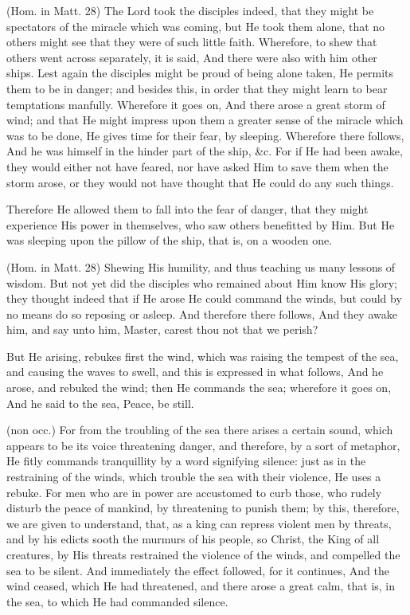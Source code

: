 (Hom. in Matt. 28) The Lord took the disciples indeed, that they might be spectators of the miracle which was coming, but He took them alone, that no others might see that they were of such little faith. Wherefore, to shew that others went across separately, it is said, And there were also with him other ships. Lest again the disciples might be proud of being alone taken, He permits them to be in danger; and besides this, in order that they might learn to bear temptations manfully. Wherefore it goes on, And there arose a great storm of wind; and that He might impress upon them a greater sense of the miracle which was to be done, He gives time for their fear, by sleeping. Wherefore there follows, And he was himself in the hinder part of the ship, \&c. For if He had been awake, they would either not have feared, nor have asked Him to save them when the storm arose, or they would not have thought that He could do any such things.

 Therefore He allowed them to fall into the fear of danger, that they might experience His power in themselves, who saw others benefitted by Him. But He was sleeping upon the pillow of the ship, that is, on a wooden one.

 (Hom. in Matt. 28) Shewing His humility, and thus teaching us many lessons of wisdom. But not yet did the disciples who remained about Him know His glory; they thought indeed that if He arose He could command the winds, but could by no means do so reposing or asleep. And therefore there follows, And they awake him, and say unto him, Master, carest thou not that we perish?

 But He arising, rebukes first the wind, which was raising the tempest of the sea, and causing the waves to swell, and this is expressed in what follows, And he arose, and rebuked the wind; then He commands the sea; wherefore it goes on, And he said to the sea, Peace, be still.

 (non occ.) For from the troubling of the sea there arises a certain sound, which appears to be its voice threatening danger, and therefore, by a sort of metaphor, He fitly commands tranquillity by a word signifying silence: just as in the restraining of the winds, which trouble the sea with their violence, He uses a rebuke. For men who are in power are accustomed to curb those, who rudely disturb the peace of mankind, by threatening to punish them; by this, therefore, we are given to understand, that, as a king can repress violent men by threats, and by his edicts sooth the murmurs of his people, so Christ, the King of all creatures, by His threats restrained the violence of the winds, and compelled the sea to be silent. And immediately the effect followed, for it continues, And the wind ceased, which He had threatened, and there arose a great calm, that is, in the sea, to which He had commanded silence.

